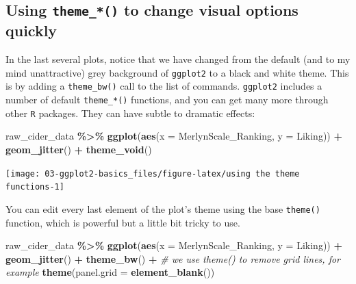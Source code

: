 \documentclass[
]{book}
\newenvironment{Shaded}{\begin{snugshade}}{\end{snugshade}}
\newcommand{\AttributeTok}[1]{\textcolor[rgb]{0.13,0.29,0.53}{#1}}
\newcommand{\CommentTok}[1]{\textcolor[rgb]{0.56,0.35,0.01}{\textit{#1}}}
\newcommand{\FunctionTok}[1]{\textcolor[rgb]{0.13,0.29,0.53}{\textbf{#1}}}
\newcommand{\NormalTok}[1]{#1}
\newcommand{\SpecialCharTok}[1]{\textcolor[rgb]{0.81,0.36,0.00}{\textbf{#1}}}
\begin{document}
\hypertarget{using-theme_-to-change-visual-options-quickly}{%
\subsection{\texorpdfstring{Using \texttt{theme\_*()} to change visual options quickly}{Using theme\_*() to change visual options quickly}}\label{using-theme_-to-change-visual-options-quickly}}

In the last several plots, notice that we have changed from the default (and to my mind unattractive) grey background of \texttt{ggplot2} to a black and white theme. This is by adding a \texttt{theme\_bw()} call to the list of commands. \texttt{ggplot2} includes a number of default \texttt{theme\_*()} functions, and you can get many more through other \texttt{R} packages. They can have subtle to dramatic effects:

\begin{Shaded}
\begin{Highlighting}[]
\NormalTok{raw\_cider\_data }\SpecialCharTok{\%\textgreater{}\%}
  \FunctionTok{ggplot}\NormalTok{(}\FunctionTok{aes}\NormalTok{(}\AttributeTok{x =}\NormalTok{ MerlynScale\_Ranking, }\AttributeTok{y =}\NormalTok{ Liking)) }\SpecialCharTok{+} 
  \FunctionTok{geom\_jitter}\NormalTok{() }\SpecialCharTok{+} 
  \FunctionTok{theme\_void}\NormalTok{()}
\end{Highlighting}
\end{Shaded}

\begin{center}\texttt{[image: 03-ggplot2-basics\_files/figure-latex/using the theme functions-1]} \end{center}

You can edit every last element of the plot's theme using the base \texttt{theme()} function, which is powerful but a little bit tricky to use.

\begin{Shaded}
\begin{Highlighting}[]
\NormalTok{raw\_cider\_data }\SpecialCharTok{\%\textgreater{}\%}
  \FunctionTok{ggplot}\NormalTok{(}\FunctionTok{aes}\NormalTok{(}\AttributeTok{x =}\NormalTok{ MerlynScale\_Ranking, }\AttributeTok{y =}\NormalTok{ Liking)) }\SpecialCharTok{+} 
  \FunctionTok{geom\_jitter}\NormalTok{() }\SpecialCharTok{+} 
  \FunctionTok{theme\_bw}\NormalTok{() }\SpecialCharTok{+} 
  \CommentTok{\# we use theme() to remove grid lines, for example}
  \FunctionTok{theme}\NormalTok{(}\AttributeTok{panel.grid =} \FunctionTok{element\_blank}\NormalTok{())}
\end{Highlighting}
\end{Shaded}
\end{document}

